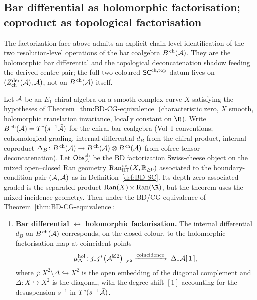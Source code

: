 \subsection{Bar differential as holomorphic factorisation; coproduct as
topological factorisation}\label{subsec:bar-diff-as-hol-fact}

The factorization face above admits an explicit chain-level
identification of the two resolution-level operations of the bar
coalgebra $B^{\,\mathrm{ch}}(\mathcal{A})$. They are the holomorphic bar
differential and the topological deconcatenation shadow feeding the
derived-centre pair; the full two-coloured $\mathsf{SC}^{\mathrm{ch},\mathrm{top}}$-datum lives on
\((Z^{\mathrm{der}}_{\mathrm{ch}}(\mathcal{A}),\mathcal{A})\), not on
$B^{\,\mathrm{ch}}(\mathcal{A})$ itself.

\begin{theorem}[Bar differential = holomorphic factorisation,
coproduct = topological factorisation;
\ClaimStatusProvedHere]
\label{thm:bar-diff-eq-holfact}%
%
%
Let $\mathcal{A}$ be an $E_1$-chiral algebra on a smooth complex curve $X$
satisfying the hypotheses of Theorem~\ref{thm:BD-CG-equivalence}
(characteristic zero, $X$ smooth, holomorphic translation invariance,
locally constant on $\R$). Write
$B^{\,\mathrm{ch}}(\mathcal{A})=T^c(s^{-1}\bar{\mathcal{A}})$ for the chiral bar
coalgebra (Vol~I conventions; cohomological grading, internal differential
$d_B$ from the chiral product, internal coproduct
$\Delta_B\colon B^{\,\mathrm{ch}}(\mathcal{A})\to B^{\,\mathrm{ch}}(\mathcal{A})\otimes
B^{\,\mathrm{ch}}(\mathcal{A})$ from cofree-tensor-deconcatenation). Let
$\mathsf{Obs}^{\mathrm{ch}}_{\mathcal{A}}$ be the BD factorization Swiss-cheese object
on the mixed open--closed Ran geometry
$\mathrm{Ran}^{\mathrm{oc}}_{\mathrm{HT}}(X,\mathbb{R}_{\geq 0})$ associated
to the boundary-condition pair $(\mathcal{A},\mathcal{A})$ as in
Definition~\ref{def:BD-SC}. Its depth-zero associated graded is the
separated product $\Ran(X)\times\Ran(\R)$, but the theorem uses the
mixed incidence geometry. Then under the
BD/CG equivalence of Theorem~\ref{thm:BD-CG-equivalence}:
\begin{enumerate}[label=\textup{(\roman*)}]
\item \textbf{Bar differential $\leftrightarrow$ holomorphic
factorisation.} The internal differential $d_B$ on
$B^{\,\mathrm{ch}}(\mathcal{A})$ corresponds, on the closed colour, to the
holomorphic factorisation map at coincident points
\begin{equation}\label{eq:hol-fact-map}
 \mu^{\mathrm{hol}}_{\Delta}\colon
 j_*j^*\bigl(\mathcal{A}^{\boxtimes 2}\bigr)\bigl|_{X^2}
 \;\xrightarrow{\text{coincidence}}\;
 \Delta_*\mathcal{A}[\,1\,],
\end{equation}
where $j\colon X^2\setminus\Delta\hookrightarrow X^2$ is the open
embedding of the diagonal complement and $\Delta\colon X\hookrightarrow
X^2$ is the diagonal, with the degree shift $[1]$ accounting for the
desuspension $s^{-1}$ in $T^c(s^{-1}\bar{\mathcal{A}})$.


\end{enumerate}
\end{theorem}
